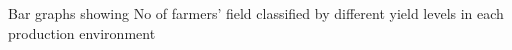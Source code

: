  Bar graphs showing No of farmers' field classified by different yield levels in each production environment
        \label{fig: yield_level_bar}